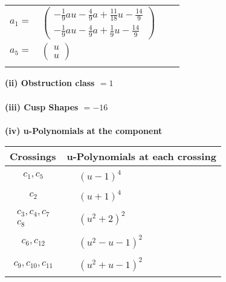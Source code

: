 \documentclass[1p]{elsarticle_modified}
\theoremstyle{definition}
\begin{document}
\begin{tabular}{m{7pt} m{180pt} m{7pt} m{180pt} }
\flushright $a_{1}=$&$\begin{pmatrix}-\frac{1}{9} a u-\frac{4}{9} a+\frac{11}{18} u-\frac{14}{9}\\-\frac{1}{9} a u-\frac{4}{9} a+\frac{1}{9} u-\frac{14}{9}\end{pmatrix}$ \\
\flushright $a_{5}=$&$\begin{pmatrix}u\\u\end{pmatrix}$\\&\end{tabular}
\flushleft \textbf{(ii) Obstruction class $= 1$}\\~\\
\flushleft \textbf{(iii) Cusp Shapes $= -16$}\\~\\
\newpage\renewcommand{\arraystretch}{1}
\flushleft \textbf{(iv) u-Polynomials at the component}\newline \\
\begin{tabular}{m{50pt}|m{274pt}}
Crossings & \hspace{64pt}u-Polynomials at each crossing \\
\hline $$\begin{aligned}c_{1},c_{5}\end{aligned}$$&$\begin{aligned}
&(u-1)^4
\end{aligned}$\\
\hline $$\begin{aligned}c_{2}\end{aligned}$$&$\begin{aligned}
&(u+1)^4
\end{aligned}$\\
\hline $$\begin{aligned}c_{3},c_{4},c_{7}\\c_{8}\end{aligned}$$&$\begin{aligned}
&(u^2+2)^2
\end{aligned}$\\
\hline $$\begin{aligned}c_{6},c_{12}\end{aligned}$$&$\begin{aligned}
&(u^2- u-1)^2
\end{aligned}$\\
\hline $$\begin{aligned}c_{9},c_{10},c_{11}\end{aligned}$$&$\begin{aligned}
&(u^2+u-1)^2
\end{aligned}$\\
\hline
\end{tabular}\\~\\
\end{document}
